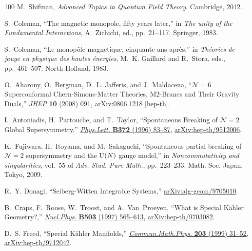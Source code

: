 \begin{thebibliography}{100}
M.~Shifman, {\em Advanced Topics in Quantum Field Theory}.
\newblock Cambridge, 2012.

S.~Coleman, ``The magnetic monopole, fifty years later,'' in {\em The unity of the Fundamental Interactions}, A.~Zichichi, ed., pp.~21--117.
\newblock Springer, 1983.

S.~Coleman, ``Le monop\^ole magnetique, cinquante ans apr\`es,'' in {\em Th\'eories de jauge en physique des hautes \'energies}, M.~K. Gaillard and R.~Stora, eds., pp.~461--507.
\newblock North Holland, 1983.

O.~Aharony, O.~Bergman, D.~L. Jafferis, and J.~Maldacena, ``{${\mathcal{N}}\!=6$ Superconformal Chern-Simons-Matter Theories, M2-Branes and Their Gravity Duals},''
\href{http://dx.doi.org/10.1088/1126-6708/2008/10/091}{{\em JHEP} {\bfseries 10} (2008) 091},
\href{http://arxiv.org/abs/0806.1218}{{\ttfamily arXiv:0806.1218 [hep-th]}}.

I.~Antoniadis, H.~Partouche, and T.~Taylor, ``{Spontaneous Breaking of ${\mathcal{N}}\!=2$ Global Supersymmetry},''
\href{http://dx.doi.org/10.1016/0370-2693(96)00028-7}{{\em Phys.Lett.} {\bfseries B372} (1996) 83--87},
\href{http://arxiv.org/abs/hep-th/9512006}{{\ttfamily arXiv:hep-th/9512006}}.

K.~Fujiwara, H.~Itoyama, and M.~Sakaguchi, ``Spontaneous partial breaking of {$\mathcal{N}=2$} supersymmetry and the {${\mathrm{U}}(N)$} gauge model,'' in {\em Noncommutativity and singularities}, vol.~55 of {\em Adv. Stud. Pure Math.}, pp.~223--233.
\newblock Math. Soc. Japan, Tokyo, 2009.

R.~Y. Donagi, ``{Seiberg-Witten Integrable Systems},''
\href{http://arxiv.org/abs/alg-geom/9705010}{{\ttfamily arXiv:alg-geom/9705010}}.

B.~Craps, F.~Roose, W.~Troost, and A.~Van~Proeyen, ``{What is Special K\"ahler Geometry?},''
\href{http://dx.doi.org/10.1016/S0550-3213(97)00408-2}{{\em Nucl.Phys.} {\bfseries B503} (1997) 565--613},
\href{http://arxiv.org/abs/hep-th/9703082}{{\ttfamily arXiv:hep-th/9703082}}.

D.~S. Freed, ``{Special K\"ahler Manifolds},''
\href{http://dx.doi.org/10.1007/s002200050604}{{\em Commun.Math.Phys.} {\bfseries 203} (1999) 31--52},
\href{http://arxiv.org/abs/hep-th/9712042}{{\ttfamily arXiv:hep-th/9712042}}.


\end{thebibliography}
